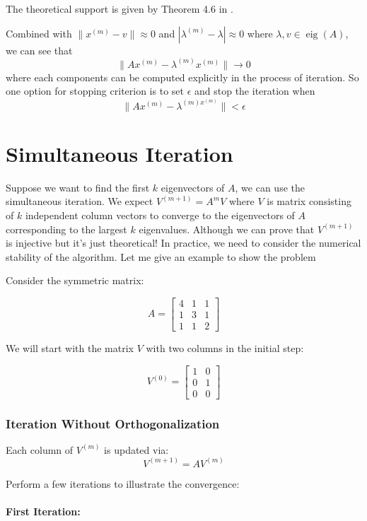 \documentclass[12pt]{article}
\begin{document}
The theoretical support is given by Theorem 4.6 in \cite{borm2012numerical}.

Combined with $\|x^{(m)}-v\|\approx 0$ and $|\lambda^{(m)} -\lambda|\approx 0$ where $\lambda, v\in\operatorname{eig}(A)$, we can see that
$$
\|Ax^{(m)}-\lambda^{(m)}x^{(m)}\| \to 0
$$
where each components can be computed explicitly in the process of iteration. So one option for stopping criterion is to set $\epsilon$ and stop the iteration when
$$
\|Ax^{(m)}-\lambda^{(m)x^{(m)}}\| < \epsilon
$$

\section{Simultaneous Iteration}

Suppose we want to find the first $k$ eigenvectors of $A$, we can use the simultaneous iteration. 
We expect $V^{(m+1)} = A^{m}V$ where $V$ is matrix consisting of $k$ independent column vectors to converge to the eigenvectors of $A$ corresponding to the largest $k$ eigenvalues.
Although we can prove that $V^{(m+1)}$ is injective but it's just theoretical! In practice, we need to consider the numerical stability of the algorithm. Let me give an example to show the problem

Consider the symmetric matrix:

$$
A = \begin{bmatrix} 4 & 1 & 1 \\ 1 & 3 & 1 \\ 1 & 1 & 2 \end{bmatrix}
$$

We will start with the matrix $V$ with two columns in the initial step:

$$
V^{(0)} = \begin{bmatrix} 1 & 0 \\ 0 & 1 \\ 0 & 0 \end{bmatrix}
$$

\subsubsection*{Iteration Without Orthogonalization}

Each column of $ V^{(m)} $ is updated via:
$$
V^{(m+1)} = A V^{(m)}
$$

Perform a few iterations to illustrate the convergence:

\paragraph{First Iteration:}
\end{document}
